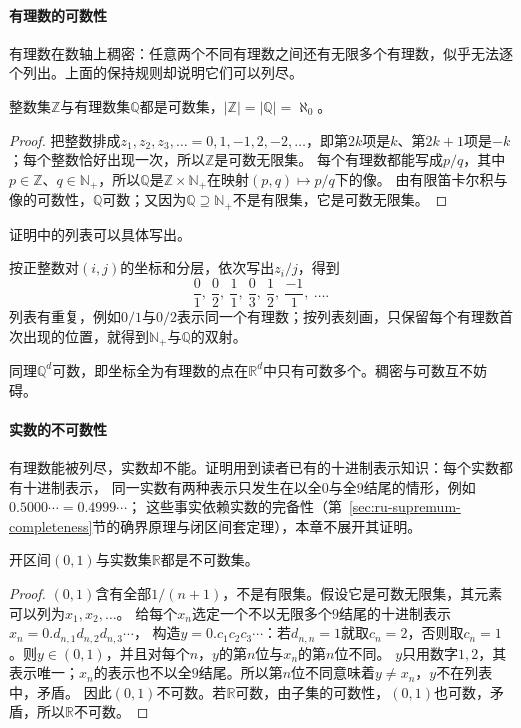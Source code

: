 \paragraph{有理数的可数性}
有理数在数轴上稠密：任意两个不同有理数之间还有无限多个有理数，似乎无法逐个列出。上面的保持规则却说明它们可以列尽。
\begin{theorem}[有理数可数]
\label{thm:card-rationals-countable}
整数集$\mathbb Z$与有理数集$\mathbb Q$都是可数集，$|\mathbb Z|=|\mathbb Q|=\aleph_0$。
\end{theorem}
\begin{proof}
把整数排成$z_1,z_2,z_3,\ldots=0,1,-1,2,-2,\ldots$，即第$2k$项是$k$、第$2k+1$项是$-k$；每个整数恰好出现一次，所以$\mathbb Z$是可数无限集。
每个有理数都能写成$p/q$，其中$p\in\mathbb Z$、$q\in\mathbb N_+$，所以$\mathbb Q$是$\mathbb Z\times\mathbb N_+$在映射$(p,q)\mapsto p/q$下的像。
由有限笛卡尔积与像的可数性，$\mathbb Q$可数；又因为$\mathbb Q\supseteq\mathbb N_+$不是有限集，它是可数无限集。
\end{proof}
证明中的列表可以具体写出。
\begin{example}[有理数的一份列表]
\label{ex:card-rationals-listing}
按正整数对$(i,j)$的坐标和分层，依次写出$z_i/j$，得到
\[
 \frac{0}{1},\ \frac{0}{2},\ \frac{1}{1},\ \frac{0}{3},\ \frac{1}{2},\ \frac{-1}{1},\ \ldots.
\]
列表有重复，例如$0/1$与$0/2$表示同一个有理数；按列表刻画，只保留每个有理数首次出现的位置，就得到$\mathbb N_+$与$\mathbb Q$的双射。
\end{example}
同理$\mathbb Q^d$可数，即坐标全为有理数的点在$\mathbb R^d$中只有可数多个。稠密与可数互不妨碍。

\paragraph{实数的不可数性}
\label{sec:comb-real-uncountable}
有理数能被列尽，实数却不能。证明用到读者已有的十进制表示知识：每个实数都有十进制表示，
同一实数有两种表示只发生在以全$0$与全$9$结尾的情形，例如$0.5000\cdots=0.4999\cdots$；
这些事实依赖实数的完备性（第~\ref{sec:ru-supremum-completeness}节的确界原理与闭区间套定理），本章不展开其证明。
\begin{theorem}[实数不可数]
\label{thm:card-reals-uncountable}
开区间$(0,1)$与实数集$\mathbb R$都是不可数集。
\end{theorem}
\begin{proof}
$(0,1)$含有全部$1/(n+1)$，不是有限集。假设它是可数无限集，其元素可以列为$x_1,x_2,\ldots$。
给每个$x_n$选定一个不以无限多个$9$结尾的十进制表示$x_n=0.d_{n,1}d_{n,2}d_{n,3}\cdots$，
构造$y=0.c_1c_2c_3\cdots$：若$d_{n,n}=1$就取$c_n=2$，否则取$c_n=1$。则$y\in(0,1)$，并且对每个$n$，$y$的第$n$位与$x_n$的第$n$位不同。
$y$只用数字$1,2$，其表示唯一；$x_n$的表示也不以全$9$结尾。所以第$n$位不同意味着$y\neq x_n$，$y$不在列表中，矛盾。
因此$(0,1)$不可数。若$\mathbb R$可数，由子集的可数性，$(0,1)$也可数，矛盾，所以$\mathbb R$不可数。
\end{proof}

